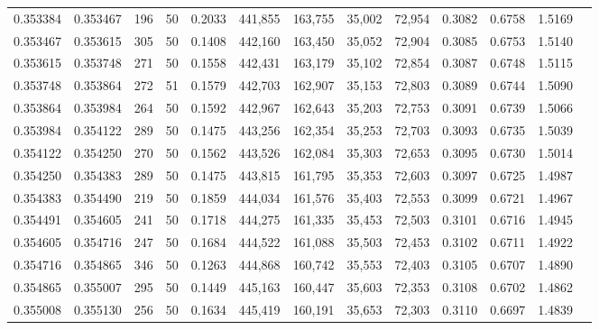 \begin{tabular}{rrrrrrrrrrrrr}
0.353384 & 0.353467 &   196 &  50 &                                     0.2033 & 441,855 & 163,755 &  35,002 &  72,954 & 0.3082 & 0.6758 & 1.5169 \\
0.353467 & 0.353615 &   305 &  50 &                                     0.1408 & 442,160 & 163,450 &  35,052 &  72,904 & 0.3085 & 0.6753 & 1.5140 \\
0.353615 & 0.353748 &   271 &  50 &                                     0.1558 & 442,431 & 163,179 &  35,102 &  72,854 & 0.3087 & 0.6748 & 1.5115 \\
0.353748 & 0.353864 &   272 &  51 &                                     0.1579 & 442,703 & 162,907 &  35,153 &  72,803 & 0.3089 & 0.6744 & 1.5090 \\
0.353864 & 0.353984 &   264 &  50 &                                     0.1592 & 442,967 & 162,643 &  35,203 &  72,753 & 0.3091 & 0.6739 & 1.5066 \\
0.353984 & 0.354122 &   289 &  50 &                                     0.1475 & 443,256 & 162,354 &  35,253 &  72,703 & 0.3093 & 0.6735 & 1.5039 \\
0.354122 & 0.354250 &   270 &  50 &                                     0.1562 & 443,526 & 162,084 &  35,303 &  72,653 & 0.3095 & 0.6730 & 1.5014 \\
0.354250 & 0.354383 &   289 &  50 &                                     0.1475 & 443,815 & 161,795 &  35,353 &  72,603 & 0.3097 & 0.6725 & 1.4987 \\
0.354383 & 0.354490 &   219 &  50 &                                     0.1859 & 444,034 & 161,576 &  35,403 &  72,553 & 0.3099 & 0.6721 & 1.4967 \\
0.354491 & 0.354605 &   241 &  50 &                                     0.1718 & 444,275 & 161,335 &  35,453 &  72,503 & 0.3101 & 0.6716 & 1.4945 \\
0.354605 & 0.354716 &   247 &  50 &                                     0.1684 & 444,522 & 161,088 &  35,503 &  72,453 & 0.3102 & 0.6711 & 1.4922 \\
0.354716 & 0.354865 &   346 &  50 &                                     0.1263 & 444,868 & 160,742 &  35,553 &  72,403 & 0.3105 & 0.6707 & 1.4890 \\
0.354865 & 0.355007 &   295 &  50 &                                     0.1449 & 445,163 & 160,447 &  35,603 &  72,353 & 0.3108 & 0.6702 & 1.4862 \\
0.355008 & 0.355130 &   256 &  50 &                                     0.1634 & 445,419 & 160,191 &  35,653 &  72,303 & 0.3110 & 0.6697 & 1.4839 \\

\end{tabular}
